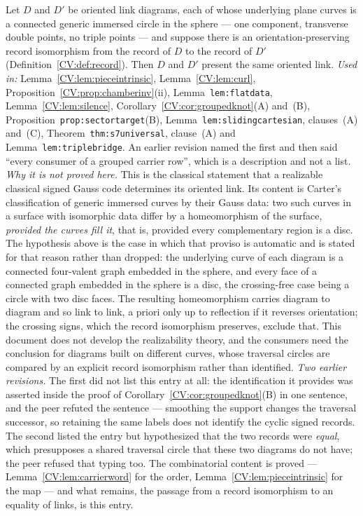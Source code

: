 \begin{theorem}\label{CV:ax:gausscode}\leanok
Let $D$ and $D'$ be oriented link diagrams, each of whose underlying plane
curves is a connected generic immersed circle in the sphere --- one component,
transverse double points, no triple points --- and suppose there is an
orientation-preserving record isomorphism from the record of $D$ to the record
of $D'$ (Definition~\ref{CV:def:record}). Then $D$ and $D'$ present the same
oriented link.
\emph{Used in:} Lemma~\ref{CV:lem:pieceintrinsic}, Lemma~\ref{CV:lem:curl},
Proposition~\ref{CV:prop:chamberinv}(ii), Lemma~\texttt{lem:flatdata},
Lemma~\ref{CV:lem:silence}, Corollary~\ref{CV:cor:groupedknot}(A) and~(B),
Proposition~\texttt{prop:sectortarget}(B),
Lemma~\texttt{lem:slidingcartesian},
clauses~(A) and~(C), Theorem~\texttt{thm:s7universal}, clause~(A) and
Lemma~\texttt{lem:triplebridge}. An earlier revision named the first and then said
``every consumer of a grouped carrier row'', which is a description and not a
list.
\emph{Why it is not proved here.} This is the classical statement that a
realizable classical signed Gauss code determines its oriented link. Its content
is Carter's classification of generic immersed curves by their Gauss data: two
such curves in a surface with isomorphic data differ by a homeomorphism of the
surface, \emph{provided the curves fill it}, that is, provided every
complementary region is a disc. The hypothesis above is the case in which that
proviso is automatic and is stated for that reason rather than dropped: the
underlying curve of each diagram is a connected four-valent graph embedded in
the sphere, and every face of a connected graph embedded in the sphere is a
disc, the crossing-free case being a circle with two disc faces. The resulting
homeomorphism carries diagram to diagram and so link to link, a priori only up
to reflection if it reverses orientation; the crossing signs, which the record
isomorphism preserves, exclude that. This document does not develop the
realizability theory, and the consumers need the conclusion for diagrams built
on different curves, whose traversal circles are compared by an explicit record
isomorphism rather than identified.
\emph{Two earlier revisions.} The first did not list this entry at all: the
identification it provides was asserted inside the proof of
Corollary~\ref{CV:cor:groupedknot}(B) in one sentence, and the peer refuted the
sentence --- smoothing the support changes the traversal successor, so retaining
the same labels does not identify the cyclic signed records. The second listed
the entry but hypothesized that the two records were \emph{equal}, which
presupposes a shared traversal circle that these two diagrams do not have; the
peer refused that typing too. The combinatorial content is proved ---
Lemma~\ref{CV:lem:carrierword} for the order, Lemma~\ref{CV:lem:pieceintrinsic} for
the map --- and what remains, the passage from a record isomorphism to an
equality of links, is this entry.
\end{theorem}
